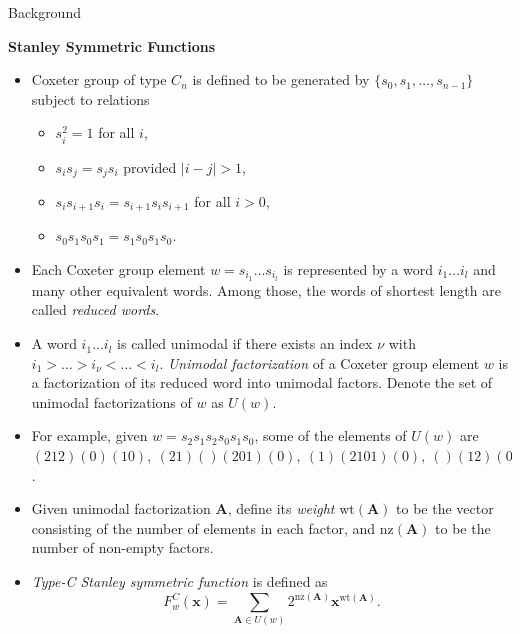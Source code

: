 \documentclass[final]{beamer}
\theoremstyle{definition}
\numberwithin{equation}{section}
\newcommand{\wt}{\mathrm{wt}}
\newcommand{\nz}{\mathrm{nz}}
\newlength{\onecolwid}
\newlength{\twocolwid}
\begin{document}
\begin{frame}[t]
\begin{columns}[t]
\begin{column}{\twocolwid}
\begin{columns}[t]
\begin{column}{\onecolwid}
\begin{block}{Background}

\textbf{Stanley Symmetric Functions}
\begin{itemize}
\item Coxeter group of type $C_n$ is defined to be generated by $\{s_0, s_1, \ldots, s_{n-1}\}$ subject to relations
	\begin{itemize}
	\item $s_i^2 = 1$ for all $i$,  
	\item $s_i s_j = s_j s_i$ provided $|i-j|>1$, 
	\item $s_i s_{i+1} s_i = s_{i+1} s_i s_{i+1}$ for all $i>0$,
	\item $s_0 s_1 s_0 s_1 = s_1 s_0 s_1 s_0$.
	\end{itemize}
\item Each Coxeter group element $w=s_{i_1}\ldots s_{i_l}$ is represented by a word $i_1\ldots i_l$ and many other equivalent words. Among those, the words of shortest length are called \textit{reduced words}.

\item A word $i_1\ldots i_l$ is called unimodal if there exists an index $\nu$ with $i_1 > \ldots > i_\nu < \ldots < i_l$.  \textit{Unimodal factorization} of a Coxeter group element $w$ is a factorization of its reduced word into unimodal factors. Denote the set of unimodal factorizations of $w$ as $U(w)$.

\item For example, given $w=s_2 s_1 s_2 s_0 s_1 s_0$, some of the elements of $U(w)$ are $(212)(0)(10),\ (21)()(201)(0),\ (1)(2101)(0),\ ()(12)(01)(01)$.

\item Given unimodal factorization $\mathbf{A}$, define its \textit{weight} $\wt(\mathbf{A})$ to be the vector 
consisting of the number of elements in each factor, and $\nz(\mathbf{A})$ to be the number of non-empty factors.


\item \textit{Type-C Stanley symmetric function} is defined as 
$$F^C_w(\mathbf{x}) = \sum_{\mathbf{A} \in U(w)} 2^{\nz(\mathbf{A})} \mathbf{x}^{\wt(\mathbf{A})}.$$
\end{itemize}
\vskip 15pt


\end{block}
\end{column}
\end{columns}
\end{column}
\end{columns}
\end{frame}
\end{document}
